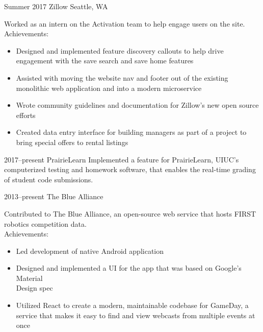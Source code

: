 \documentclass[nofooter]{resume}
\begin{document}
\begin{entrylist}


\entry
{Summer 2017}
{Zillow}
{Seattle, WA}
{Worked as an intern on the Activation team to help engage users on the site. \\
Achievements:
\noindent\begin{itemize}[leftmargin=0.45cm]
\item Designed and implemented feature discovery callouts to help drive engagement with the save search and save home features
\item Assisted with moving the website nav and footer out of the existing monolithic web application and into a modern microservice
\item Wrote community guidelines and documentation for Zillow's new open source efforts
\item Created data entry interface for building managers as part of a project to bring special offers to rental listings
\end{itemize}}


\entry
{2017--present}
{PrairieLearn}
{}
{Implemented a feature for PrairieLearn, UIUC's computerized testing and homework software, that enables the real-time grading of student code submissions.}


\entry
{2013--present}
{The Blue Alliance}
{}
{Contributed to The Blue Alliance, an open-source web service that hosts FIRST robotics competition data. \\
Achievements:
\noindent\begin{itemize}[leftmargin=0.45cm]
\item Led development of native Android application
\item Designed and implemented a UI for the app that was based on Google's Material \\Design spec
\item Utilized React to create a modern, maintainable codebase for GameDay, a service that makes it easy to find and view webcasts from multiple events at once
\end{itemize}}

\end{entrylist}

\end{document}
